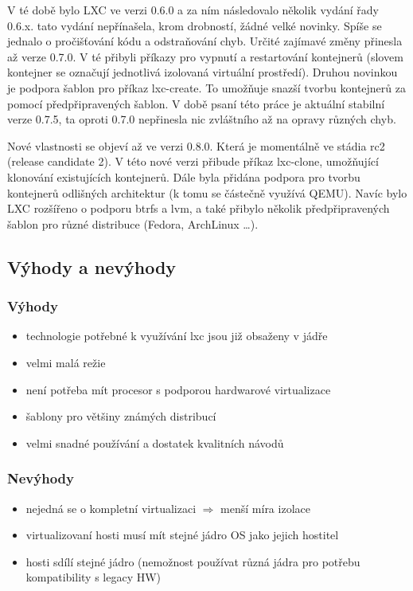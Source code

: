 V té době bylo LXC ve verzi 0.6.0 a za ním následovalo několik vydání řady 0.6.x. tato vydání nepřínašela, krom drobností, žádné velké novinky. Spíše se jednalo o pročišťování kódu a odstraňování chyb. Určité zajímavé změny přinesla až verze 0.7.0. V té přibyli příkazy pro vypnutí a restartování kontejnerů (slovem kontejner se označují jednotlivá izolovaná virtuální prostředí). Druhou novinkou je podpora šablon pro příkaz lxc-create. To umožňuje snazší tvorbu kontejnerů za pomocí předpřipravených šablon. V době psaní této práce je aktuální stabilní verze 0.7.5, ta oproti 0.7.0 nepřinesla nic zvláštního až na opravy různých chyb. 

Nové vlastnosti se objeví až ve verzi 0.8.0. Která je momentálně ve stádia rc2 (release candidate 2). V této nové verzi přibude příkaz lxc-clone, umožňující klonování existujících kontejnerů. Dále byla přidána podpora pro tvorbu kontejnerů odlišných architektur (k tomu se částečně využívá QEMU). Navíc bylo LXC rozšířeno o podporu btrfs a lvm, a také přibylo několik předpřipravených šablon pro různé distribuce (Fedora, ArchLinux \dots).

\subsection{Výhody a nevýhody}

\subsubsection{Výhody}
\begin{itemize}
  \item technologie potřebné k využívání lxc jsou již obsaženy v jádře
  \item velmi malá režie
  \item není potřeba mít procesor s podporou hardwarové virtualizace
  \item šablony pro většiny známých distribucí
  \item velmi snadné používání a dostatek kvalitních návodů 
\end{itemize}

\subsubsection{Nevýhody}
\begin{itemize}
  \item nejedná se o kompletní virtualizaci $\Rightarrow$ menší míra izolace
  \item virtualizovaní hosti musí mít stejné jádro OS jako jejich hostitel
  \item hosti sdílí stejné jádro (nemožnost používat různá jádra pro potřebu kompatibility s legacy HW)
\end{itemize}
  
